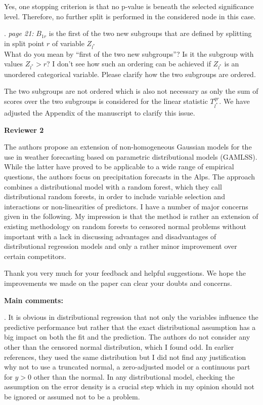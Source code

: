 \documentclass[american,foldmarks=false,noconfig]{uibklttr}
\newenvironment{review}{\fontshape{\itdefault}\fontseries{\bfdefault} \selectfont \smallskip}{\par}
\begin{document}
Yes, one stopping criterion is that no p-value is beneath the 
selected significance level. Therefore, no further 
split is performed in the considered node in this case.

\begin{review}
20. {\color{quotecolor}\textit{page 21:} $B_{1r}$ is the first 
of the two new subgroups that are defined by splitting in split 
point $r$ of variable $Z_{l^{\ast}}$}\\
What do you mean by ``first of the two new subgroups''? Is it 
the subgroup with values $Z_{l^{\ast}} > r$? I don't see how 
such an ordering can be achieved if $Z_{l^{\ast}}$ is an 
unordered categorical variable. Please clarify how the two
subgroups are ordered.
\end{review}

The two subgroups are not ordered which is also not necessary as only 
the sum of scores over the two subgroups is considered for the linear 
statistic $T_{l^{\ast}}^{qr}$. We have adjusted the Appendix of
the manuscript to clarify this issue.

\newpage


\textbf{\LARGE Reviewer 2}

\begin{review}
The authors propose an extension of non-homogeneous Gaussian models 
for the use in weather forecasting based on parametric distributional 
models (GAMLSS). While the latter have proved to be applicable to a 
wide range of empirical questions, the authors focus on precipitation 
forecasts in the Alps. The approach combines a distributional model 
with a random forest, which they call distributional random forests, 
in order to include variable selection and interactions or 
non-linearities of predictors. I have a number of major concerns 
given in the following. My impression is that the method is rather
an extension of existing methodology on random forests to censored 
normal problems without important with a lack in discussing 
advantages and disadvantages of distributional regression models 
and only a rather minor improvement over certain competitors.
\end{review}

Thank you very much for your feedback and helpful suggestions. We hope 
the improvements we made on the paper can clear your doubts and concerns.

\bigskip

\textbf{Main comments:}

\begin{review}
1. It is obvious in distributional regression that not only the 
variables influence the predictive performance but rather that 
the exact distributional assumption has a big impact on both the 
fit and the prediction. The authors do not consider any other
than the censored normal distribution, which I found odd. 
In earlier references, they used the same distribution but I 
did not find any justification why not to use a truncated normal, 
a zero-adjusted model or a continuous part for $y > 0$ other
than the normal. In any distributional model, checking the 
assumption on the error density is a crucial step which in 
my opinion should not be ignored or assumed not to be a problem.
\end{review}
\end{document}
